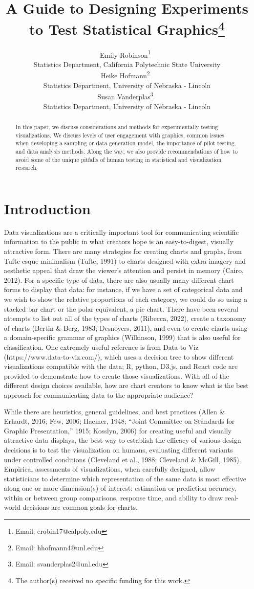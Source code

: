 \documentclass[
  10pt,
]{article}
\title{A Guide to Designing Experiments to Test Statistical
Graphics\thanks{The author(s) received no specific funding for this
work.}}
\author{Emily
Robinson\footnote{Email: erobin17@calpoly.edu}~\orcidlink{0000-0001-9800-7304}\\{\footnotesize Statistics
Department}, {\footnotesize California Polytechnic State
University}\\Heike
Hofmann\footnote{Email: hhofmann4@unl.edu}~\orcidlink{0000-0001-6216-5183}\\{\footnotesize Statistics
Department}, {\footnotesize University of Nebraska - Lincoln}\\Susan
Vanderplas\footnote{Email: svanderplas2@unl.edu}~\orcidlink{0000-0002-3803-0972}\\{\footnotesize Statistics
Department}, {\footnotesize University of Nebraska - Lincoln}\\}
\begin{document}
\maketitle
\begin{abstract}
In this paper, we discuss considerations and methods for experimentally
testing visualizations. We discuss levels of user engagement with
graphics, common issues when developing a sampling or data generation
model, the importance of pilot testing, and data analysis methods. Along
the way, we also provide recommendations of how to avoid some of the
unique pitfalls of human testing in statistical and visualization
research.
\end{abstract}


\section{Introduction}\label{introduction}

Data visualizations are a critically important tool for communicating
scientific information to the public in what creators hope is an
easy-to-digest, visually attractive form. There are many strategies for
creating charts and graphs, from Tufte-esque minimalism (Tufte, 1991) to
charts designed with extra imagery and aesthetic appeal that draw the
viewer's attention and persist in memory (Cairo, 2012). For a specific
type of data, there are also usually many different chart forms to
display that data: for instance, if we have a set of categorical data
and we wish to show the relative proportions of each category, we could
do so using a stacked bar chart or the polar equivalent, a pie chart.
There have been several attempts to list out all of the types of charts
(Ribecca, 2022), create a taxonomy of charts (Bertin \& Berg, 1983;
Desnoyers, 2011), and even to create charts using a domain-specific
grammar of graphics (Wilkinson, 1999) that is also useful for
classification. One extremely useful reference is from Data to Viz
(https://www.data-to-viz.com/), which uses a decision tree to show
different visualizations compatible with the data; R, python, D3.js, and
React code are provided to demonstrate how to create those
visualizations. With all of the different design choices available, how
are chart creators to know what is the best approach for communicating
data to the appropriate audience?

While there are heuristics, general guidelines, and best practices
(Allen \& Erhardt, 2016; Few, 2006; Haemer, 1948; {``Joint Committee on
Standards for Graphic Presentation,''} 1915; Kosslyn, 2006) for creating
useful and visually attractive data displays, the best way to establish
the efficacy of various design decisions is to test the visualization on
humans, evaluating different variants under controlled conditions
(Cleveland et al., 1988; Cleveland \& McGill, 1985). Empirical
assessments of visualizations, when carefully designed, allow
statisticians to determine which representation of the same data is most
effective along one or more dimension(s) of interest: estimation or
prediction accuracy, within or between group comparisons, response time,
and ability to draw real-world decisions are common goals for charts.
\end{document}
